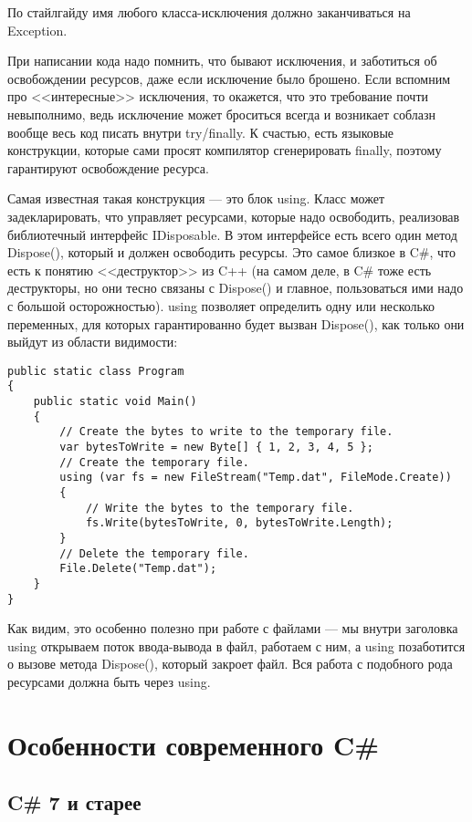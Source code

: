 \documentclass{../../text-style}
\begin{document}
По стайлгайду имя любого класса-исключения должно заканчиваться на Exception.

При написании кода надо помнить, что бывают исключения, и заботиться об освобождении ресурсов, даже если исключение было брошено. Если вспомним про <<интересные>> исключения, то окажется, что это требование почти невыполнимо, ведь исключение может броситься всегда и возникает соблазн вообще весь код писать внутри try/finally. К счастью, есть языковые конструкции, которые сами просят компилятор сгенерировать finally, поэтому гарантируют освобождение ресурса.

Самая известная такая конструкция --- это блок using. Класс может задекларировать, что управляет ресурсами, которые надо освободить, реализовав библиотечный интерфейс IDisposable. В этом интерфейсе есть всего один метод Dispose(), который и должен освободить ресурсы. Это самое близкое в C\#, что есть к понятию <<деструктор>> из C++ (на самом деле, в C\# тоже есть деструкторы, но они тесно связаны с Dispose() и главное, пользоваться ими надо с большой осторожностью). using позволяет определить одну или несколько переменных, для которых гарантированно будет вызван Dispose(), как только они выйдут из области видимости:

\begin{verbatim}
public static class Program 
{
    public static void Main() 
    {
        // Create the bytes to write to the temporary file.
        var bytesToWrite = new Byte[] { 1, 2, 3, 4, 5 };
        // Create the temporary file.
        using (var fs = new FileStream("Temp.dat", FileMode.Create)) 
        {
            // Write the bytes to the temporary file.
            fs.Write(bytesToWrite, 0, bytesToWrite.Length);
        }
        // Delete the temporary file.
        File.Delete("Temp.dat");
    }
}
\end{verbatim}

Как видим, это особенно полезно при работе с файлами --- мы внутри заголовка using открываем поток ввода-вывода в файл, работаем с ним, а using позаботится о вызове метода Dispose(), который закроет файл. Вся работа с подобного рода ресурсами должна быть через using.

\section{Особенности современного C\#}

\subsection{C\# 7 и старее}
\end{document}
